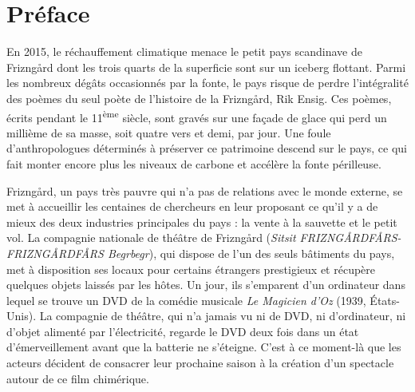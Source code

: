 \chapter*{Préface}
En 2015, le réchauffement climatique menace le petit pays scandinave de
Frizngård dont les trois quarts de la superficie sont sur un iceberg
flottant.
Parmi les nombreux dégâts occasionnés par la fonte, le
pays risque de perdre l'intégralité des poèmes du seul poète de
l'histoire de la Frizngård, Rik Ensig. Ces poèmes, écrits pendant le
11\textsuperscript{ème} siècle, sont gravés sur une façade de glace qui perd
un millième de sa masse, soit quatre vers et demi, par jour. Une foule
d'anthropologues déterminés à préserver ce patrimoine descend sur le pays,
ce qui fait monter encore plus les niveaux de carbone et accélère la fonte
périlleuse.\par
Frizngård, un pays très pauvre qui n'a pas de relations avec le monde externe, se met à accueillir les centaines de chercheurs en leur proposant
ce qu'il y a de mieux des deux industries principales du pays : la vente à la
sauvette et le petit vol. La compagnie nationale de théâtre de Frizngård
(\emph{Sitsit FRIZNGÅRDFÅRS-FRIZNGÅRDFÅRS Begrbegr}), qui
dispose de l'un des seuls bâtiments du pays, met à disposition ses
locaux pour certains étrangers prestigieux et récupère quelques objets
\og{}laissés\fg{} par les hôtes. Un jour, ils s'emparent d'un ordinateur dans lequel se
trouve un DVD de la comédie musicale
\emph{Le Magicien d'Oz} (1939, États-Unis).
La compagnie de théâtre, qui n'a jamais vu ni de DVD,
ni d'ordinateur, ni d'objet alimenté par l'électricité, regarde le DVD deux
fois dans un état d'émerveillement avant que la batterie ne s'éteigne. C'est
à ce moment-là que les acteurs décident de consacrer leur prochaine saison à la
création d'un spectacle autour de ce film chimérique.\par
